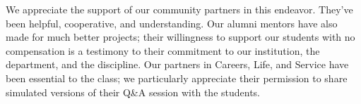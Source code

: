 \begin{acks}
We appreciate the support of our community partners in this endeavor.
They've been helpful, cooperative, and understanding.  Our alumni mentors
have also made for much better projects; their willingness to support
our students with no compensation is a testimony to their
commitment to our institution, the department, and the discipline.  
Our partners in Careers, Life, and Service have been essential to
the class; we particularly appreciate their permission to share
simulated versions of their Q\&A session with the students.
\end{acks}
